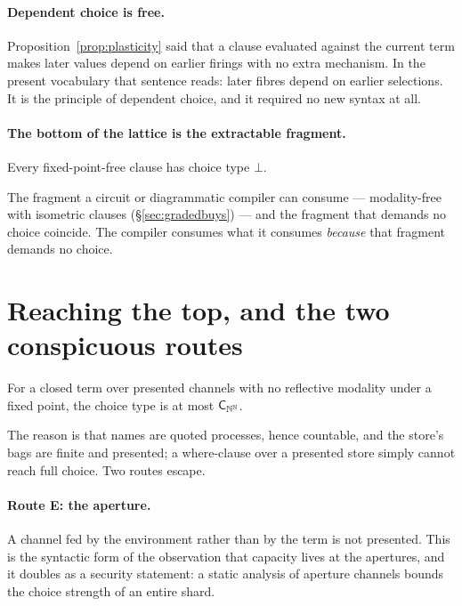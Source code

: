 \paragraph{Dependent choice is free.} Proposition~\ref{prop:plasticity} said that a
clause evaluated against the current term makes later values depend on earlier
firings with no extra mechanism. In the present vocabulary that sentence reads:
later fibres depend on earlier selections. It is the principle of dependent
choice, and it required no new syntax at all.

\paragraph{The bottom of the lattice is the extractable fragment.}

\begin{proposition}[Bottom]
\label{prop:bottom}
Every fixed-point-free clause has choice type $\bot$.
\end{proposition}

\begin{corollary}
\label{cor:extractable}
The fragment a circuit or diagrammatic compiler can consume --- modality-free with
isometric clauses (\S\ref{sec:gradedbuys}) --- and the fragment that demands no
choice coincide. The compiler consumes what it consumes \emph{because} that
fragment demands no choice.
\end{corollary}

\section{Reaching the top, and the two conspicuous routes}
\label{sec:ceiling}

\begin{proposition}[Ceiling]
\label{prop:ceiling}
For a closed term over presented channels with no reflective modality under a
fixed point, the choice type is at most $\mathsf{C}_{\mathbb{N}^{\mathbb{N}}}$.
\end{proposition}

The reason is that names are quoted processes, hence countable, and the store's
bags are finite and presented; a where-clause over a presented store simply cannot
reach full choice. Two routes escape.

\paragraph{Route E: the aperture.} A channel fed by the environment rather than by
the term is not presented. This is the syntactic form of the observation that
capacity lives at the apertures, and it doubles as a security statement: a static
analysis of aperture channels bounds the choice strength of an entire shard.

